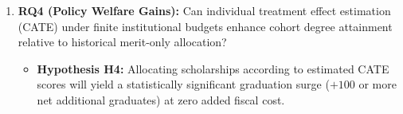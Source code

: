 \begin{enumerate}[leftmargin=*]
    \item \textbf{RQ4 (Policy Welfare Gains):} Can individual treatment effect estimation (CATE) under finite institutional budgets enhance cohort degree attainment relative to historical merit-only allocation?
    \begin{itemize}
        \item \textbf{Hypothesis H4:} Allocating scholarships according to estimated CATE scores will yield a statistically significant graduation surge ($+100$ or more net additional graduates) at zero added fiscal cost.
    \end{itemize}
\end{enumerate}
